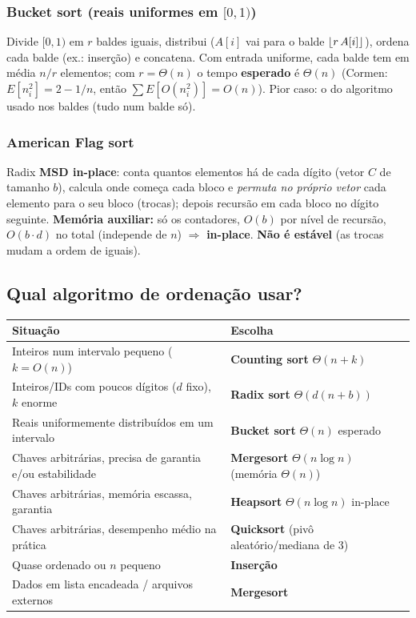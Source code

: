 \subsubsection*{Bucket sort (reais uniformes em $[0,1)$)}
Divide $[0,1)$ em $r$ baldes iguais, distribui ($A[i]$ vai para o balde $\lfloor r\,A[i]\rfloor$), ordena cada balde (ex.: inserção) e concatena. Com entrada uniforme, cada balde tem em média $n/r$ elementos; com $r=\Theta(n)$ o tempo \textbf{esperado} é $\Theta(n)$ (Cormen: $E[n_i^2]=2-1/n$, então $\sum E[O(n_i^2)]=O(n)$). Pior caso: o do algoritmo usado nos baldes (tudo num balde só).

\subsubsection*{American Flag sort}
Radix \textbf{MSD in-place}: conta quantos elementos há de cada dígito (vetor $C$ de tamanho $b$), calcula onde começa cada bloco e \emph{permuta no próprio vetor} cada elemento para o seu bloco (trocas); depois recursão em cada bloco no dígito seguinte. \textbf{Memória auxiliar:} só os contadores, $O(b)$ por nível de recursão, $O(b\cdot d)$ no total (independe de $n$) $\Rightarrow$ \textbf{in-place}. \textbf{Não é estável} (as trocas mudam a ordem de iguais).

\subsection{Qual algoritmo de ordenação usar?}\label{sec:escolhasort}
\begin{center}
\small
\begin{tabularx}{\linewidth}{@{}lX@{}}
\toprule
Situação & Escolha\\
\midrule
Inteiros num intervalo pequeno ($k=O(n)$) & \textbf{Counting sort} $\Theta(n+k)$\\
Inteiros/IDs com poucos dígitos ($d$ fixo), $k$ enorme & \textbf{Radix sort} $\Theta(d(n+b))$\\
Reais uniformemente distribuídos em um intervalo & \textbf{Bucket sort} $\Theta(n)$ esperado\\
Chaves arbitrárias, precisa de garantia e/ou estabilidade & \textbf{Mergesort} $\Theta(n\log n)$ (memória $\Theta(n)$)\\
Chaves arbitrárias, memória escassa, garantia & \textbf{Heapsort} $\Theta(n\log n)$ in-place\\
Chaves arbitrárias, desempenho médio na prática & \textbf{Quicksort} (pivô aleatório/mediana de 3)\\
Quase ordenado ou $n$ pequeno & \textbf{Inserção}\\
Dados em lista encadeada / arquivos externos & \textbf{Mergesort}\\
\bottomrule
\end{tabularx}
\end{center}

